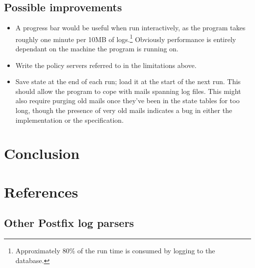 \documentclass[a4paper,12pt,draft]{article}
\begin{document}
\subsection{Possible improvements}
\begin{itemize}

    \item A progress bar would be useful when run interactively, as the
        program takes roughly one minute per 10MB of
        logs.\footnote{Approximately 80\% of the run time is consumed by
        logging to the database.}  Obviously performance is entirely
        dependant on the machine the program is running on.

    \item Write the policy servers referred to in the limitations above.

    \item Save state at the end of each run; load it at the start of the
        next run.  This should allow the program to cope with mails
        spanning log files.  This might also require purging old mails once
        they've been in the state tables for too long, though the presence
        of very old mails indicates a bug in either the implementation or
        the specification.

\end{itemize}

\section{Conclusion}

\label{conclusion}


\appendix


\section{References}

\label{references}

\subsection{Other Postfix log parsers}

\label{other-parsers}
\end{document}
